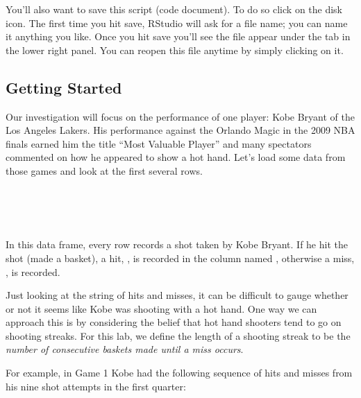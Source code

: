 \documentclass[11pt]{article}
\begin{document}
You'll also want to save this script (code document). To do so click on the disk icon. The first time you hit save, RStudio will ask for a file name; you can name it anything you like. Once you hit save you'll see the file appear under the  tab in the lower right panel. You can reopen this file anytime by simply clicking on it.

%

\subsection*{Getting Started}
Our investigation will focus on the performance of one player: Kobe Bryant of the Los Angeles Lakers.  His performance against the Orlando Magic in the 2009 NBA finals earned him the title ``Most Valuable Player'' and many spectators commented on how he appeared to show a hot hand.  Let's load some data from those games and look at the first several rows.

\ttfamily\noindent
{}\hlkeyword{(}\hlkeyword{,}{\ }\hlargument{=}{\ }\hlkeyword{)}\hspace*{\fill}\\
\hlstd{}\hlkeyword{(}\hlkeyword{)}\hspace*{\fill}\\
\hlstd{}\hlkeyword{(}\hlkeyword{)}\hspace*{\fill}\\
\normalfont

In this data frame, every row records a shot taken by Kobe Bryant.  If he hit the shot (made a basket), a hit, \texttt{}, is recorded in the column named \texttt{}, otherwise a miss, \texttt{}, is recorded.

Just looking at the string of hits and misses, it can be difficult to gauge whether or not it seems like Kobe was shooting with a hot hand.  One way we can approach this is by considering the belief that hot hand shooters tend to go on shooting streaks.  For this lab, we define the length of a shooting streak to be the \emph{number of consecutive baskets made until a miss occurs}.

For example, in Game 1 Kobe had the following sequence of hits and misses from his nine shot attempts in the first quarter:
\end{document}
